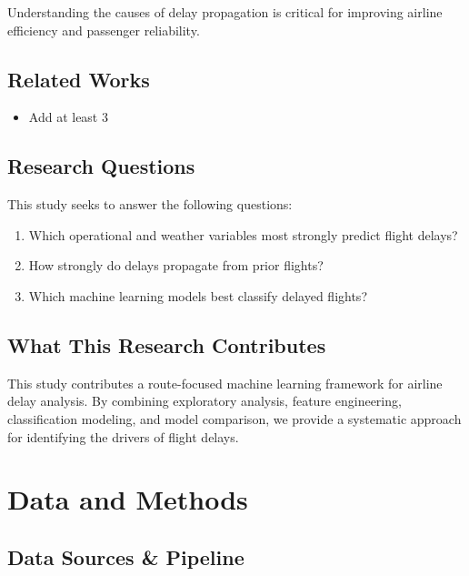 \documentclass[
  letterpaper,
  DIV=11,
  numbers=noendperiod]{scrartcl}
\providecommand{\tightlist}{%
  \setlength{\itemsep}{0pt}\setlength{\parskip}{0pt}}
\begin{document}
Understanding the causes of delay propagation is critical for improving
airline efficiency and passenger reliability.

\subsection{Related Works}\label{related-works}

\begin{itemize}
\tightlist
\item
  Add at least 3
\end{itemize}

\subsection{Research Questions}\label{research-questions}

This study seeks to answer the following questions:

\begin{enumerate}
\def\labelenumi{\arabic{enumi}.}
\tightlist
\item
  Which operational and weather variables most strongly predict flight
  delays?
\item
  How strongly do delays propagate from prior flights?
\item
  Which machine learning models best classify delayed flights?
\end{enumerate}

\subsection{What This Research
Contributes}\label{what-this-research-contributes}

This study contributes a route-focused machine learning framework for
airline delay analysis. By combining exploratory analysis, feature
engineering, classification modeling, and model comparison, we provide a
systematic approach for identifying the drivers of flight delays.

\section{Data and Methods}\label{data-and-methods}

\subsection{Data Sources \& Pipeline}\label{data-sources-pipeline}
\end{document}
